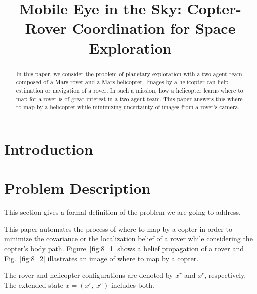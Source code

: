 \documentclass[conference]{IEEEtran}
\begin{document}
\title{\huge Mobile Eye in the Sky: Copter-Rover Coordination for Space Exploration}


\maketitle

\begin{abstract}
In this paper, we consider the problem of planetary exploration with a two-agent team composed of a Mars rover and a Mars helicopter. Images by a helicopter can help estimation or navigation of a rover. In such a mission, how a helicopter learns where to map for a rover is of great interest in a two-agent team. 
This paper answers this where to map by a helicopter while minimizing uncertainty of images from a rover’s camera.
\end{abstract}

\IEEEpeerreviewmaketitle

\section{Introduction}


\section{Problem Description}
This section gives a formal definition of the problem we are going to address. 

This paper automates the process of where to map by a copter in order to minimize the covariance or the localization belief of a rover while considering the copter’s body path. Figure~\ref{fig:8_1} shows a belief propagation of a rover and Fig.~\ref{fig:8_2} illastrates an image of where to map by a copter.

The rover and helicopter configurations are denoted by $x^r$ and $x^c$, respectively. The extended state $x=(x^r,~x^c)$ includes both.
\end{document}

